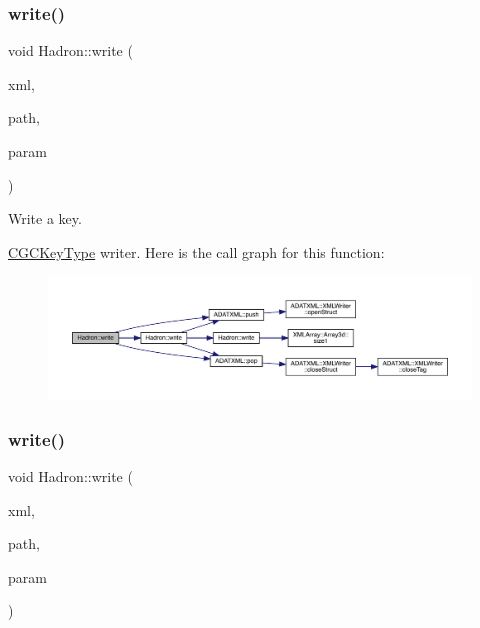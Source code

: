 \subsubsection{\texorpdfstring{write()}{write()}\hspace{0.1cm}{\footnotesize\ttfamily [4/95]}}
{\footnotesize\ttfamily void Hadron\+::write (\begin{DoxyParamCaption}\item[{\mbox{\hyperlink{classADATXML_1_1XMLWriter}{X\+M\+L\+Writer}} \&}]{xml,  }\item[{const std\+::string \&}]{path,  }\item[{const \mbox{\hyperlink{structHadron_1_1KeyCGCSU3__t}{Key\+C\+G\+C\+S\+U3\+\_\+t}} \&}]{param }\end{DoxyParamCaption})}



Write a key. 

\mbox{\hyperlink{structHadron_1_1CGCKeyType}{C\+G\+C\+Key\+Type}} writer. Here is the call graph for this function\+:\nopagebreak
\begin{figure}[H]
\begin{center}
\leavevmode
\includegraphics[width=350pt]{d1/daf/namespaceHadron_a1df6238e1c6eca70a3e05655f2680904_cgraph}
\end{center}
\end{figure}
\mbox{\label{namespaceHadron_a7da51caa70247c9ab9d11f8275ec93b7}} 
\subsubsection{\texorpdfstring{write()}{write()}\hspace{0.1cm}{\footnotesize\ttfamily [5/95]}}
{\footnotesize\ttfamily void Hadron\+::write (\begin{DoxyParamCaption}\item[{\mbox{\hyperlink{classADATXML_1_1XMLWriter}{X\+M\+L\+Writer}} \&}]{xml,  }\item[{const std\+::string \&}]{path,  }\item[{const \mbox{\hyperlink{structHadron_1_1QuarkNum__t}{Quark\+Num\+\_\+t}} \&}]{param }\end{DoxyParamCaption})}



